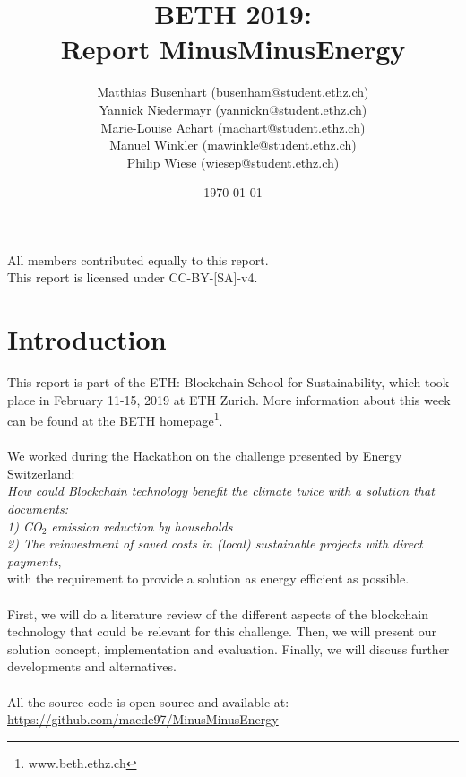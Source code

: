 \documentclass[11pt]{article}
\title{BETH 2019:\\Report MinusMinusEnergy}
\author{ Matthias Busenhart (busenham@student.ethz.ch)\\Yannick Niedermayr (yannickn@student.ethz.ch)\\ Marie-Louise Achart (machart@student.ethz.ch)\\Manuel Winkler (mawinkle@student.ethz.ch)\\Philip Wiese (wiesep@student.ethz.ch)}
\date{\today}
\begin{document}
\maketitle
\thispagestyle{empty}
\vspace{10cm}
\begin{center}
	All members contributed equally to this report.\\
	This report is licensed under CC-BY-[SA]-v4.
\end{center}

\newpage
\tableofcontents

\pagebreak
\section{Introduction}
This report is part of the ETH: Blockchain School for Sustainability, which took place in February 11-15, 2019 at ETH Zurich. More information about this week can be found at the \href{www.beth.ethz.ch}{BETH homepage}\footnote{www.beth.ethz.ch}.\\\\
We worked during the Hackathon on the challenge presented by Energy Switzerland:\\ \textit{How could Blockchain technology benefit the climate twice with a solution that documents:\\
1) CO$_2$ emission reduction by households\\
2) The reinvestment of saved costs in (local) sustainable projects with direct payments},\\
with the requirement to provide a solution as energy efficient as possible.\\\\
First, we will do a literature review of the different aspects of the blockchain technology that could be relevant for this challenge. Then, we will present our solution concept, implementation and evaluation. Finally, we will discuss further developments and alternatives.\\\\
All the source code is open-source and available at:\\ \href{https://github.com/maede97/MinusMinusEnergy}{https://github.com/maede97/MinusMinusEnergy}\\
\end{document}
